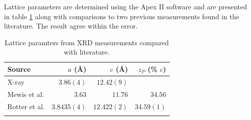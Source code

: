 Lattice parameters are determined using the Apex II software and are presented in table \ref{Table:3:LatticeParams} along with comparisons to two previous measurements found in the literature. The result agree within the error.
\medskip
\begin{table}[htbp]
    \begin{center}
        \caption{Lattice paramters from XRD measurements compared with literature.}
        \begin{tabular}{lrrr}
\toprule
Source  &  $a$ (\AA) & $c$ (\AA) & $z_P$ (\% $c$)\\
\midrule
X-ray   & $3.86(4)$  & $12.42(9)$ & \\
Mewis et al.\cite{Mewis1980} & $3.63$ & $11.76$ & $34.56$ \\
Rotter et al.\cite{Rotter2010} & $3.8435(4) $ & $12.422(2)$ & $34.59(1)$ \\
\bottomrule
        \label{Table:3:LatticeParams}
        \end{tabular}
    \end{center}
\end{table}

